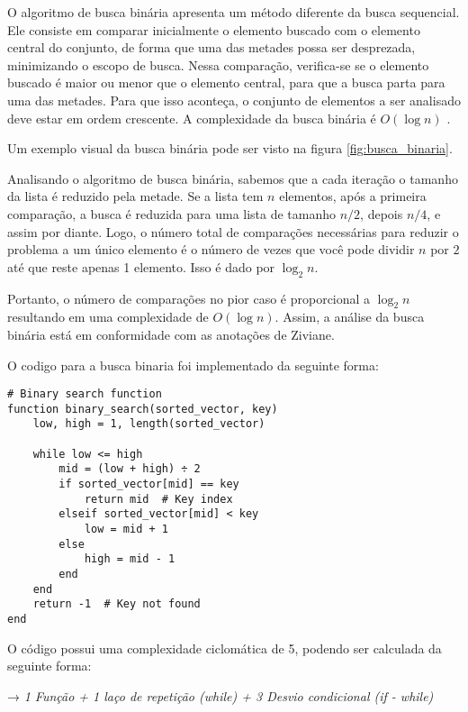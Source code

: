 \documentclass[12pt]{article}
\begin{document}
    O algoritmo de busca binária apresenta um método diferente da busca sequencial. Ele consiste em comparar inicialmente o elemento buscado com o elemento central do conjunto, de forma que uma das metades possa ser desprezada, minimizando o escopo de busca. Nessa comparação, verifica-se se o elemento buscado é maior ou menor que o elemento central, para que a busca parta para uma das metades. Para que isso aconteça, o conjunto de elementos a ser analisado deve estar em ordem crescente. A complexidade da busca binária é \(O(\log n)\) \cite{ziviani:1999}.

    Um exemplo visual da busca binária pode ser visto na figura \ref{fig:busca_binaria}.
    
    Analisando o algoritmo de busca binária, sabemos que a cada iteração o tamanho da lista é reduzido pela metade. Se a lista tem \(n\) elementos, após a primeira comparação, a busca é reduzida para uma lista de tamanho \(n/2\), depois \(n/4\), e assim por diante. Logo, o número total de comparações necessárias para reduzir o problema a um único elemento é o número de vezes que você pode dividir \(n\) por \(2\) até que reste apenas 1 elemento. Isso é dado por \(\log_2 n\).
    
    Portanto, o número de comparações no pior caso é proporcional a \(\log_2 n\) resultando em uma complexidade de \(O(\log n)\). Assim, a análise da busca binária está em conformidade com as anotações de Ziviane.


     O codigo para a busca binaria foi implementado da seguinte forma:
         
    \begin{verbatim}
# Binary search function
function binary_search(sorted_vector, key)
    low, high = 1, length(sorted_vector)

    while low <= high
        mid = (low + high) ÷ 2
        if sorted_vector[mid] == key
            return mid  # Key index
        elseif sorted_vector[mid] < key
            low = mid + 1
        else
            high = mid - 1
        end
    end
    return -1  # Key not found
end
    \end{verbatim}

    O código possui uma complexidade ciclomática de 5, podendo ser calculada da seguinte forma: 

    \begin{center}
        → \textit{1 Função + 1 laço de repetição (while) + 3 Desvio condicional (if - while)}
    \end{center}
    
\end{document}
